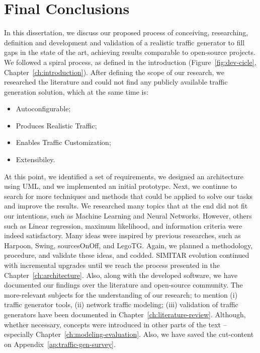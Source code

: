 \chapter{Final Conclusions}\label{ch:conclusion}



In this dissertation, we discuss our proposed process of conceiving, researching, definition and development and validation of a realistic traffic generator to fill gaps in the state of the art,  achieving results comparable to open-source projects.  We followed a spiral process, as defined in the introduction (Figure~\ref{fig:dev-cicle},  Chapter~\ref{ch:introduction}).  After defining the scope of our research, we researched the literature and could not find any publicly available traffic generation solution, which  at the same time is:

\begin{itemize}
\item Autoconfigurable;
\item Produces Realistic Traffic;
\item Enables Traffic Customization;
\item Extensibiley.
\end{itemize}

At this point, we identified a set of  requirements,  we designed an architecture using UML,  and we implemented  an initial prototype. Next, we continue to search for more techniques and methods that could be applied to solve our tasks and improve the results.  We researched many topics that at the end did not fit our intentions, such as Machine Learning and Neural Networks. However, others such as Linear regression, maximum likelihood, and information criteria were indeed satisfactory. Many ideas were inspired by previous researches, such as Harpoon, Swing, sourcesOnOff, and LegoTG.  Again, we planned a methodology, procedure, and validate these ideas, and codded.  SIMITAR evolution continued with incremental upgrades until we reach the process presented in the Chapter~\ref{ch:architecture}. Also, along with the developed software, we have documented our findings over the literature and open-source community. The more-relevant subjects for the understanding of our research; to mention (i) traffic generator tools, (ii) network traffic modeling; (iii) validation of traffic generators have been documented in Chapter~\ref{ch:literature-review}. Although, whether necessary, concepts were introduced in other parts of the text -- especially Chapter~\ref{ch:modeling-evaluation}.  Also, we have saved the cut-content on Appendix~\ref{ap:traffic-gen-survey}. 

